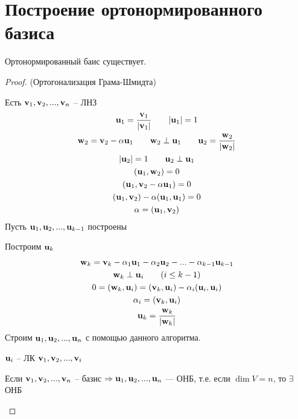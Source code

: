 \section{Построение ортонормированного базиса}

\begin{theorem}
    Ортонормированный баис существует.
\end{theorem}

\begin{proof} (Ортогонализация Грама-Шмидта)
    
    Есть $\mathbf{v}_1, \mathbf{v}_2, ..., \mathbf{v}_n$ -- ЛНЗ
    \begin{gather*}
        \mathbf{u}_1 = \frac{\mathbf{v}_1}{|\mathbf{v}_1|} \qquad |\mathbf{u}_1| = 1\\
        \mathbf{w}_2 = \mathbf{v}_2 - \alpha \mathbf{u}_1 \qquad \mathbf{w}_2 \perp \mathbf{u}_1 \qquad \mathbf{u}_2 = \frac{\mathbf{w}_2}{|\mathbf{w}_2|}\\
        |\mathbf{u}_2|=1 \qquad \mathbf{u}_2 \perp \mathbf{u}_1\\
        (\mathbf{u}_1, \mathbf{w}_2) = 0\\
        (\mathbf{u}_1, \mathbf{v}_2 - \alpha \mathbf{u}_ 1) = 0\\
        (\mathbf{u}_1, \mathbf{v}_2) - \alpha (\mathbf{u}_1, \mathbf{u}_1)=0\\
        \alpha = (\mathbf{u}_1, \mathbf{v}_2)
    \end{gather*}
    Пусть $\mathbf{u}_1, \mathbf{u}_2, ..., \mathbf{u}_{k-1}$ построены
    
    Построим $\mathbf{u}_k$
    \begin{gather*}
        \mathbf{w}_k = \mathbf{v}_k - \alpha_1 \mathbf{u}_1 - \alpha_2 \mathbf{u}_2 - ... - \alpha_{k-1} \mathbf{u}_{k-1}\\
        \mathbf{w}_k \perp \mathbf{u}_i \qquad (i \le k-1)\\
        0 = (\mathbf{w}_k, \mathbf{u}_i) = (\mathbf{v}_k, \mathbf{u}_i) - \alpha_i (\mathbf{u}_i, \mathbf{u}_i)\\
        \alpha_i = (\mathbf{v}_k, \mathbf{u}_i)\\
        \mathbf{u}_k = \frac{\mathbf{w}_k}{|\mathbf{w}_k|}
    \end{gather*}
    Строим $\mathbf{u}_1, \mathbf{u}_2, ..., \mathbf{u}_n$ с помощью данного алгоритма.
    \begin{remark}
        $\mathbf{u}_i$ -- ЛК $\mathbf{v}_1, \mathbf{v}_2, ..., \mathbf{v}_i$
    \end{remark}
    
    \begin{corollary}
        Если $\mathbf{v}_1, \mathbf{v}_2, ..., \mathbf{v}_n$ -- базис $\Rightarrow \mathbf{u}_1, \mathbf{u}_2, ..., \mathbf{u}_n$ --- ОНБ,
        т.е. если $\dim V = n$, то  $\exists$ ОНБ
    \end{corollary}
    

\end{proof}
